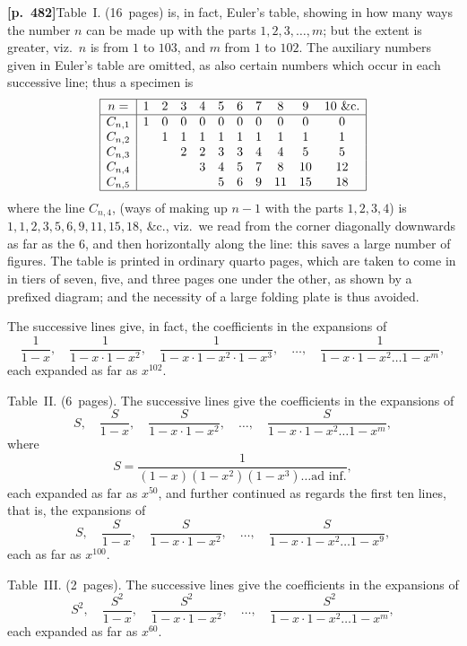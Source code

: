 \documentclass[11pt,a4paper]{article}
\begin{document}
\noindent\textbf{[p.~482]}\quad Table~I. (16~pages) is, in fact, Euler's table, showing in how many ways the number $n$ can be made up with the parts $1, 2, 3, \ldots, m$; but the extent is greater, viz.\ $n$ is from $1$ to $103$, and $m$ from $1$ to $102$. The auxiliary numbers given in Euler's table are omitted, as also certain numbers which occur in each successive line; thus a specimen is
\[
\begin{array}{|c|cccccccccc|}
\hline
n = & 1 & 2 & 3 & 4 & 5 & 6 & 7 & 8 & 9 & 10\ \&{\rm c.} \\
\hline
C_{n,1} & 1 & 0 & 0 & 0 & 0 & 0 & 0 & 0 & 0 & 0 \\
C_{n,2} &   & 1 & 1 & 1 & 1 & 1 & 1 & 1 & 1 & 1 \\
C_{n,3} &   &   & 2 & 2 & 3 & 3 & 4 & 4 & 5 & 5 \\
C_{n,4} &   &   &   & 3 & 4 & 5 & 7 & 8 & 10 & 12 \\
C_{n,5} &   &   &   &   & 5 & 6 & 9 & 11 & 15 & 18 \\
\hline
\end{array}
\]
where the line $C_{n,4}$, (ways of making up $n - 1$ with the parts $1, 2, 3, 4$) is $1, 1, 2, 3, 5, 6, 9, 11, 15, 18$, \&c., viz.\ we read from the corner diagonally downwards as far as the $6$, and then horizontally along the line: this saves a large number of figures. The table is printed in ordinary quarto pages, which are taken to come in in tiers of seven, five, and three pages one under the other, as shown by a prefixed diagram; and the necessity of a large folding plate is thus avoided.

The successive lines give, in fact, the coefficients in the expansions of
\[
\frac{1}{1-x},\quad \frac{1}{1-x \cdot 1-x^{2}},\quad \frac{1}{1-x \cdot 1-x^{2} \cdot 1-x^{3}},\quad \ldots,\quad \frac{1}{1-x \cdot 1-x^{2} \ldots 1-x^{m}},
\]
each expanded as far as $x^{102}$.

Table~II. (6~pages). The successive lines give the coefficients in the expansions of
\[
S,\quad \frac{S}{1-x},\quad \frac{S}{1-x \cdot 1-x^{2}},\quad \ldots,\quad \frac{S}{1-x \cdot 1-x^{2} \ldots 1-x^{m}},
\]
where
\[
S = \frac{1}{(1-x)(1-x^{2})(1-x^{3})\ldots\text{ad inf.}},
\]
each expanded as far as $x^{50}$, and further continued as regards the first ten lines, that is, the expansions of
\[
S,\quad \frac{S}{1-x},\quad \frac{S}{1-x \cdot 1-x^{2}},\quad \ldots,\quad \frac{S}{1-x \cdot 1-x^{2} \ldots 1-x^{9}},
\]
each as far as $x^{100}$.

Table~III. (2~pages). The successive lines give the coefficients in the expansions of
\[
S^{2},\quad \frac{S^{2}}{1-x},\quad \frac{S^{2}}{1-x \cdot 1-x^{2}},\quad \ldots,\quad \frac{S^{2}}{1-x \cdot 1-x^{2} \ldots 1-x^{m}},
\]
each expanded as far as $x^{60}$.
\end{document}
